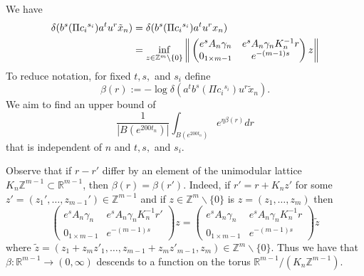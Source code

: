 \documentclass[10pt,reqno]{amsart}
\theoremstyle{Theorem}
\theoremstyle{definition}
\theoremstyle{remark}
\newcommand{\noted}[1]{\marginpar{{\color{blue}\footnotesize \begin{spacing}{1}#1\end{spacing}}}}
\newcommand{\td}{\tilde}
\DeclareMathOperator{\Id}{Id}
\newcommand{\sm}{\smallsetminus}
\newcommand{\R}{\mathbb {R}}
\newcommand{\Z}{\mathbb {Z}}
\def\red{\color{red}}
\def\blue{}
\begin{document}

We have \begin{equation}\label{integer}
\begin{split}
\delta( b^{s}(\Pi {c_i}^{s_i})a^tu^r \td x_n) &= \delta( b^{s}(\Pi {c_i}^{s_i})a^tu^r    x_n) \\&= \inf_{z \in \Z^m \setminus \{0\}} \bigg{\|}
\begin{pmatrix}
  e^{s}A_n\gamma_n & e^{s}A_n\gamma_nK_n^{-1}r \\ 0_{1\times m-1} & e^{-(m-1)s}
\end{pmatrix}
z
\bigg{\|}
\end{split}
\end{equation}
 To reduce notation, for fixed $t,s,$ and $s_i$   define $$\beta(r) :=- \log \delta (a^tb^s(\Pi {c_i}^{s_i})u^r \td x_n).$$ We aim to find an upper bound of $$\frac{1}{|B(e^{200t_n})|} \int_{B(e^{200t_n})} e^{\eta \beta(r)} dr$$ that is independent of $n$ and $ t,s,$ and $s_i$.


Observe that if $r - {r'} $ differ by an element of the unimodular lattice $ K_n \Z^{m-1}\subset \R^{m-1}$, then $\beta(r) = \beta(r')$.
{\blue
Indeed, if $r'= r+ K_n z'$ for some $z'= (z_1', \dots, z_{m-1}')\in \Z^{m-1}$ and if $z\in \Z^m\sm\{0\}$ is $z= (z_1, \dots , z_m)$ then
$$\begin{pmatrix}
  e^{s}A_n\gamma_n & e^{s}A_n\gamma_nK_n^{-1}r' \\ 0_{1\times m-1} & e^{-(m-1)s}
\end{pmatrix}z=\begin{pmatrix}
  e^{s}A_n\gamma_n & e^{s}A_n\gamma_nK_n^{-1}r \\ 0_{1\times m-1} & e^{-(m-1)s}
\end{pmatrix} \td z
$$
where $\td z = (z_1 + z_m z'_1, \dots, z_{m-1} + z_m z'_{m-1}, z_m)\in \Z^m\sm\{0\}.$
} %
Thus   we have that $\beta\colon \R^{m-1}\to (0,\infty)$ descends to a function on the torus $\R^{m-1}/(K_n \Z^{m-1})$.
\end{document}

